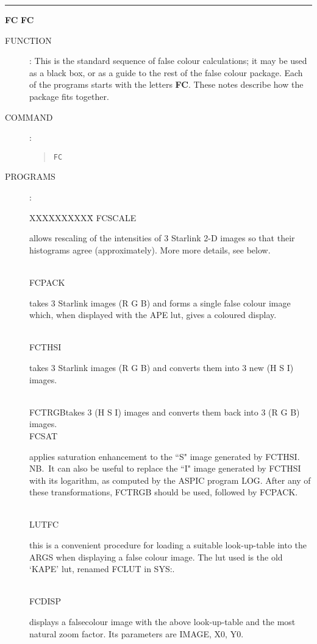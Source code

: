 \goodbreak
\rule{\textwidth}{0.3mm}
{\Large {\bf FC} \hfill {\bf FC}}
\begin{description}
\item [FUNCTION]:
This is the standard sequence of false colour calculations; it may be used as a
black box, or as a guide to the rest of the false colour package.
Each of the programs starts with the letters {\bf FC}.
These notes describe how the package fits together.
\item [COMMAND]:
\begin{quote}
{\tt FC}
\end{quote}
\item [PROGRAMS]:
\begin{tabbing}
XXXXXXXXXX\=\kill
FCSCALE\>\begin{minipage}[t]{110mm}
allows rescaling of the intensities of 3 Starlink 2-D images so that their
histograms agree (approximately).
More more details, see below.
\end{minipage}\\
FCPACK\>\begin{minipage}[t]{110mm}
takes 3 Starlink images (R G B) and forms a single false colour image which,
when displayed with the APE lut, gives a coloured display.
\end{minipage}\\
FCTHSI\>\begin{minipage}[t]{110mm}
takes 3 Starlink images (R G B) and converts them into 3 new (H S I) images.
\end{minipage}\\
FCTRGB\>takes 3 (H S I) images and converts them back into 3 (R G B) images.\\
FCSAT\>\begin{minipage}[t]{110mm}
applies saturation enhancement to the ``S" image generated by FCTHSI.
NB.\ It can also be useful to replace the ``I" image generated by FCTHSI with
its logarithm, as computed by the ASPIC program LOG.
After any of these transformations, FCTRGB should be used, followed by FCPACK.
\end{minipage}\\
LUTFC\>\begin{minipage}[t]{110mm}
this is a convenient procedure for loading a suitable look-up-table into the
ARGS when displaying a false colour image.
The lut used is the old `KAPE' lut, renamed FCLUT in
SYS:.
\end{minipage}\\
FCDISP\>\begin{minipage}[t]{110mm}
displays a falsecolour image with the above look-up-table and the most natural
zoom factor.
Its parameters are IMAGE, X0, Y0.
\end{minipage}
\end{tabbing}
\end{description}

